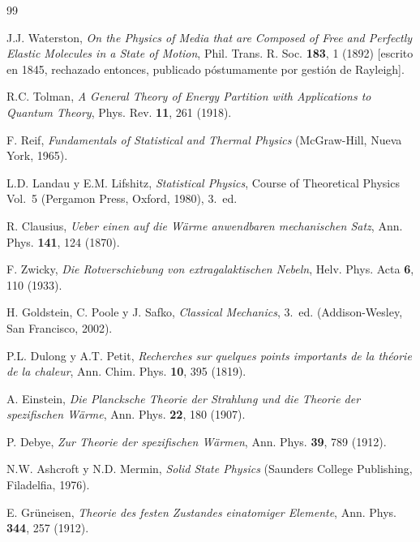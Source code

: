 \documentclass[11pt,a4paper]{article}
\begin{document}
\begin{thebibliography}{99}

J.J. Waterston, \textit{On the Physics of Media that are Composed of Free
and Perfectly Elastic Molecules in a State of Motion}, Phil. Trans. R.
Soc. \textbf{183}, 1 (1892) [escrito en 1845, rechazado entonces,
publicado póstumamente por gestión de Rayleigh].

R.C. Tolman, \textit{A General Theory of Energy Partition with
Applications to Quantum Theory}, Phys. Rev. \textbf{11}, 261 (1918).

F. Reif, \textit{Fundamentals of Statistical and Thermal Physics}
(McGraw-Hill, Nueva York, 1965).

L.D. Landau y E.M. Lifshitz, \textit{Statistical Physics}, Course of
Theoretical Physics Vol.~5 (Pergamon Press, Oxford, 1980), 3.\ ed.

R. Clausius, \textit{Ueber einen auf die Wärme anwendbaren mechanischen
Satz}, Ann. Phys. \textbf{141}, 124 (1870).

F. Zwicky, \textit{Die Rotverschiebung von extragalaktischen Nebeln},
Helv. Phys. Acta \textbf{6}, 110 (1933).

H. Goldstein, C. Poole y J. Safko, \textit{Classical Mechanics}, 3.\ ed.
(Addison-Wesley, San Francisco, 2002).

P.L. Dulong y A.T. Petit, \textit{Recherches sur quelques points
importants de la théorie de la chaleur}, Ann. Chim. Phys. \textbf{10}, 395
(1819).

A. Einstein, \textit{Die Plancksche Theorie der Strahlung und die Theorie
der spezifischen Wärme}, Ann. Phys. \textbf{22}, 180 (1907).

P. Debye, \textit{Zur Theorie der spezifischen Wärmen}, Ann. Phys.
\textbf{39}, 789 (1912).

N.W. Ashcroft y N.D. Mermin, \textit{Solid State Physics} (Saunders
College Publishing, Filadelfia, 1976).

E. Grüneisen, \textit{Theorie des festen Zustandes einatomiger Elemente},
Ann. Phys. \textbf{344}, 257 (1912).

\end{thebibliography}
\end{document}
